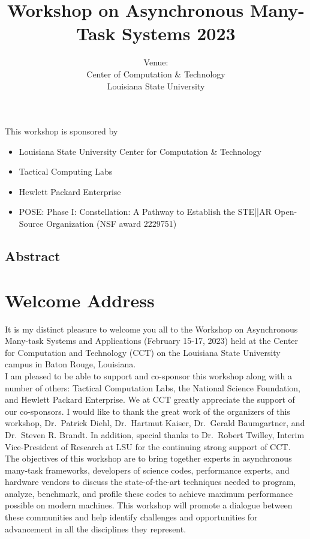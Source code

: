 \documentclass[12pt,letterpaper]{book}
\title{Workshop on Asynchronous Many-Task Systems 2023}
\author{Venue: \\ Center of Computation \& Technology \\ Louisiana State University}
\begin{document}
\frontmatter

\maketitle

This workshop is sponsored by

\begin{itemize}
\item Louisiana State University Center for Computation \& Technology 
\item Tactical Computing Labs
\item Hewlett Packard Enterprise
\item POSE: Phase I: Constellation: A Pathway to Establish the STE||AR Open-Source Organization (NSF award 2229751)
\end{itemize}

\newpage

\section*{Abstract}


\chapter{Welcome Address}
It is my distinct pleasure to welcome you all to the Workshop on Asynchronous Many-task Systems and Applications (February 15-17, 2023) held at the Center for Computation and Technology (CCT) on the Louisiana State University campus in Baton Rouge, Louisiana.\\

\noindent I am pleased to be able to support and co-sponsor this workshop along with a number of others: Tactical Computation Labs, the National Science Foundation, and Hewlett Packard Enterprise. We at CCT greatly appreciate the support of our co-sponsors. I would like to thank the great work of the organizers of this workshop, Dr.\ Patrick Diehl, Dr.\ Hartmut Kaiser, Dr.\ Gerald Baumgartner, and Dr.\ Steven R. Brandt. In addition, special thanks to Dr.\ Robert Twilley, Interim Vice-President of Research at LSU for the continuing strong support of CCT.\\

\noindent The objectives of this workshop are to bring together experts in asynchronous many-task frameworks, developers of science codes, performance experts, and hardware vendors to discuss the state-of-the-art techniques needed to program, analyze, benchmark, and profile these codes to achieve maximum performance possible on modern machines. This workshop will promote a dialogue between these communities and help identify challenges and opportunities for advancement in all the disciplines they represent.\\
\end{document}
